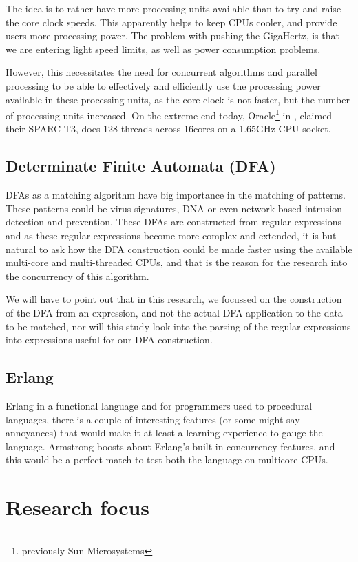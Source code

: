 \documentclass[a4paper,11pt]{report}
\begin{document}
  The idea is to rather have more processing units
available than to try and raise the core clock speeds. This apparently
helps to keep CPUs cooler, and provide users more processing
power. The problem with pushing the GigaHertz, is that we are entering
light speed limits, as well as power consumption problems.

 However, this necessitates the need for concurrent algorithms
and parallel processing to be able to effectively and efficiently use
the processing power available in these processing units, as the core
clock is not faster, but the number of processing units increased.  On
the extreme end today, Oracle\footnote{previously Sun Microsystems} in
\cite{url:T3}, claimed their SPARC T3, does 128 threads across 16cores
on a 1.65GHz CPU socket.

\subsection{Determinate Finite Automata (DFA)}
DFAs as a matching algorithm have big importance in the matching of
patterns. These patterns could be virus signatures, DNA or even
network based intrusion detection and prevention. These DFAs are
constructed from regular expressions and as these regular expressions
become more complex and extended, it is but natural to ask how the DFA
construction could be made faster using the available
multi-core and multi-threaded CPUs, and that is the reason for the
research into the concurrency of this algorithm.

We will have to point out that in this research, we focussed on the
construction of the DFA from an expression, and not the actual DFA
application to the data to be matched, nor will this study look into
the parsing of the regular expressions into expressions useful for our
DFA construction.


\subsection{Erlang}

Erlang in a functional language and for programmers used to procedural
languages, there is a couple of interesting features (or some might
say annoyances) that would make it at least a learning experience to
gauge the language. Armstrong boosts about Erlang's built-in
concurrency features, and this would be a perfect match to test both
the language on multicore CPUs.

\section{Research focus}
\end{document}
